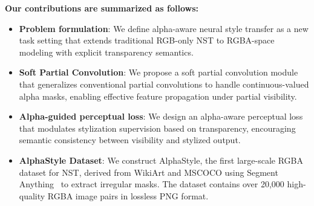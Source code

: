\textbf{Our contributions are summarized as follows:}
\begin{itemize}
    \item \textbf{Problem formulation}: We define alpha-aware neural style transfer as a new task setting that extends traditional RGB-only NST to RGBA-space modeling with explicit transparency semantics.
    
    \item \textbf{Soft Partial Convolution}: We propose a soft partial convolution module that generalizes conventional partial convolutions to handle continuous-valued alpha masks, enabling effective feature propagation under partial visibility.
    
    \item \textbf{Alpha-guided perceptual loss}: We design an alpha-aware perceptual loss that modulates stylization supervision based on transparency, encouraging semantic consistency between visibility and stylized output.
    
    \item \textbf{AlphaStyle Dataset}: We construct AlphaStyle, the first large-scale RGBA dataset for NST, derived from WikiArt and MSCOCO using Segment Anything~\cite{kirillov2023segment} to extract irregular masks. The dataset contains over 20,000 high-quality RGBA image pairs in lossless PNG format.
\end{itemize}
